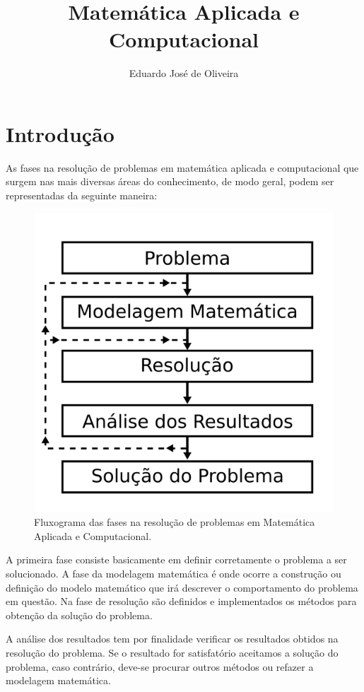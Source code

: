 \documentclass[12pt,a4paper]{book}
\title{Matemática Aplicada e Computacional}
\author{Eduardo José de Oliveira}
\begin{document}
%
%
%
\chapter{Introdução}

As fases na resolução de problemas em matemática aplicada e computacional que surgem nas mais diversas áreas do conhecimento, de modo geral, podem ser representadas da seguinte maneira:

\begin{figure}[h]
	\centering
	\includegraphics[scale=0.2]{figuras/figura_001}
	\caption{Fluxograma das fases na resolução de problemas em Matemática Aplicada e Computacional.}
\end{figure}

A primeira fase consiste basicamente em definir corretamente o problema a ser solucionado. A fase da modelagem matemática é onde ocorre a construção ou definição do modelo matemático que irá descrever o comportamento do problema em questão. Na fase de resolução são definidos e implementados os métodos para obtenção da solução do problema.

A análise dos resultados tem por finalidade verificar os resultados obtidos na resolução do problema. Se o resultado for satisfatório aceitamos a solução do problema, caso contrário, deve-se procurar outros métodos ou refazer a modelagem matemática.
\end{document}
